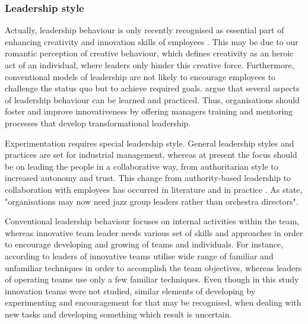 \subsubsection{Leadership style}
Actually, leadership behaviour is only recently recognised as essential part of enhancing creativity and innovation skills of employees \citep{mumford2002leading}. This may be due to our romantic perception of creative behaviour, which defines creativity as an heroic act of an individual, where leaders only hinder this creative force. Furthermore, conventional models of leadership are not likely to encourage employees to challenge the status quo but to achieve required goals.\citep{mumford2002leading} \citet{jung2003role} argue that several aspects of leadership behaviour can be learned and practiced. Thus, organisations should foster and improve innovativeness by offering managers training and mentoring processes that develop transformational leadership. 

Experimentation requires special leadership style. General leadership styles and practices are set for industrial management, whereas at present the focus should be on leading the people in a collaborative way, from authoritarian style to increased autonomy and trust. This change from authority-based leadership to collaboration with employees has occurred in literature and in practice \citep{amabile2008creativity,farson2002failuretolerantleader}. As \citet{mumford2002leading} state, "organisations may now need jazz group leaders rather than orchestra directors". 

Conventional leadership behaviour focuses on internal activities within the team, whereas innovative team leader needs various set of skills and approaches in order to encourage developing and growing of teams and individuals. For instance, according to \citet{barczak1989leadership} leaders of innovative teams utilise wide range of familiar and unfamiliar techniques in order to accomplish the team objectives, whereas leaders of operating teams use only a few familiar techniques. Even though in this study innovation teams were not studied, similar elements of developing by experimenting and encouragement for that may be recognised, when dealing with new tasks and developing something which result is uncertain. 

